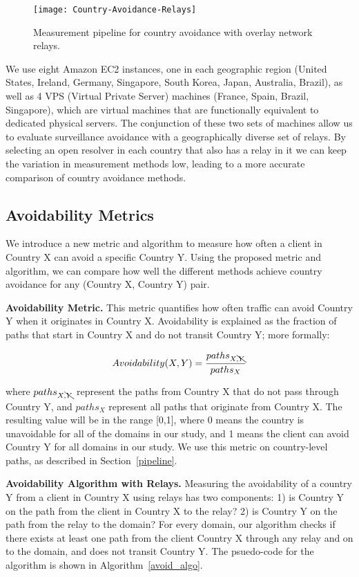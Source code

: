 \begin{figure}
\centering
\texttt{[image: Country-Avoidance-Relays]}
\caption{Measurement pipeline for country avoidance with overlay network relays.}
\label{fig:avoidance_relays}
\end{figure}

We use eight Amazon EC2 instances, one in each geographic region (United States, Ireland, Germany, Singapore, South Korea, Japan, Australia, Brazil), as well as 4 VPS (Virtual Private Server) machines (France, Spain, Brazil, Singapore), which are virtual machines that are functionally equivalent to dedicated physical servers.  The conjunction of these two sets of machines allow us to evaluate surveillance avoidance with a geographically diverse set of relays. By selecting an open resolver in each country that also has a relay in it we can keep the variation in measurement methods low, leading to a more accurate comparison of country avoidance methods.

\subsection{Avoidability Metrics}
\label{metrics}
We introduce a new metric and algorithm to measure how often a client in Country X can avoid a specific Country Y.  Using the proposed metric and algorithm, we can compare how well the different methods achieve country avoidance for any (Country X, Country Y) pair.

{\bf Avoidability Metric.}  This metric quantifies how often traffic can avoid Country Y when it originates in Country X.  Avoidability is explained as the fraction of paths that start in Country X and do not transit Country Y; more formally:

\[Avoidability(X,Y) = \frac{paths_{X,\bcancel{Y}}}{paths_{X}}\]

\noindent where $paths_{X,\bcancel{Y}}$ represent the paths from Country X that do not pass through Country Y, and $paths_{X}$ represent all paths that originate from Country X. The resulting value will be in the range [0,1], where 0 means the country is unavoidable for all of the domains in our study, and 1 means the client can avoid Country Y for all domains in our study.  We use this metric on country-level paths, as described in Section~\ref{pipeline}.

{\bf Avoidability Algorithm with Relays.}  Measuring the avoidability of a country Y from a client in Country X using relays has two components: 1) is Country Y on the path from the client in Country X to the relay?  2) is Country Y on the path from the relay to the domain?  For every domain, our algorithm checks if there exists at least one path from the client Country X through any relay and on to the domain, and does not transit Country Y.  The psuedo-code for the algorithm is shown in Algorithm~\ref{avoid_algo}.

